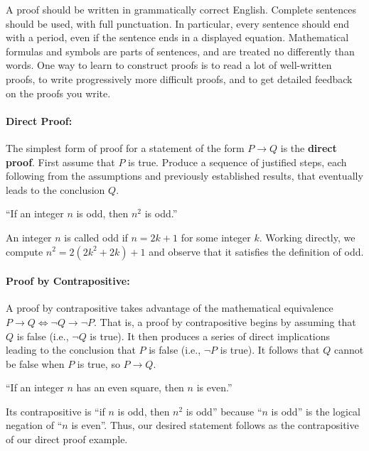 A proof should be written in grammatically correct English.
Complete sentences should be used, with full punctuation.
In particular, every sentence should end with a period, even if the sentence ends in a displayed equation.
Mathematical formulas and symbols are parts of sentences, and are treated no differently than words.
One way to learn to construct proofs is to read a lot of well-written proofs, to write progressively more difficult proofs, and to get detailed feedback on the proofs you write.


\paragraph{Direct Proof:}

The simplest form of proof for a statement of the form $P \rightarrow Q$ is the \textbf{direct proof}.
First assume that $P$ is true.
Produce a sequence of justified steps, each following from the assumptions and previously established results, that eventually leads to the conclusion $Q$.

\begin{example}
``If an integer $n$ is odd, then $n^2$ is odd.''

 An integer $n$ is called odd if $n=2k+1$ for some integer $k$.
 Working directly, we compute $n^2 = 2 (2k^2+2k)+1$ and observe that it satisfies the definition of odd.
\end{example}

\paragraph{Proof by Contrapositive:}
A proof by contrapositive takes advantage of the mathematical equivalence $P \rightarrow Q \Leftrightarrow \neg Q \rightarrow \neg P$.
That is, a proof by contrapositive begins by assuming that $Q$ is false (i.e., $\neg Q$ is true).
It then produces a series of direct implications leading to the conclusion that $P$ is false (i.e., $\neg P$ is true).
It follows that $Q$ cannot be false when $P$ is true, so $P \rightarrow Q$.

\begin{example} \label{example:even_square}
``If an integer $n$ has an even square, then $n$ is even.''

Its contrapositive is ``if $n$ is odd, then $n^2$ is odd'' because ``$n$ is odd'' is the logical negation of ``$n$ is even''.
Thus, our desired statement follows as the contrapositive of our direct proof example.
\end{example}

